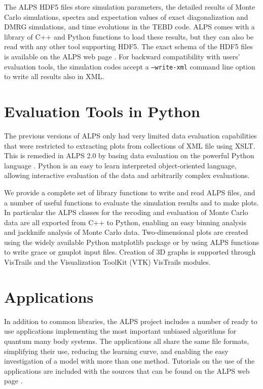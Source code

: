 \documentclass[12pt]{iopart}
\begin{document}
The ALPS HDF5 files store simulation parameters, the detailed results of Monte Carlo simulations, spectra and expectation values of exact diagonalization and DMRG simulations, and time evolutions in the TEBD code. ALPS comes with a library of C++ and Python functions to load these results, but they can also be read with any other tool supporting HDF5. The exact schema of the HDF5 files is available on the ALPS web page \cite{alps}. For backward compatibility with users' evaluation tools, the simulation codes accept a {\tt --write-xml} command line option to write all results also in XML. 

\section{Evaluation Tools in Python}

The previous versions of ALPS  only had very limited data evaluation capabilities that were restricted to extracting plots from collections of XML file using XSLT. This is remedied in ALPS 2.0 by basing data evaluation on the powerful Python language \cite{python}. Python is an easy to learn interpreted object-oriented language, allowing interactive evaluation of the data and arbitrarily complex evaluations. 

We provide a complete set of library functions to write and read ALPS files, and a number of useful functions to evaluate the simulation results and to make plots. In particular the ALPS classes for the recoding and evaluation of Monte Carlo data are all exported from C++ to Python, enabling an easy binning analysis \cite{Ambegaokar2010} and jackknife analysis of Monte Carlo data.
Two-dimensional plots are created using the widely available Python matplotlib package \cite{matplotlib} or by using ALPS functions to write grace \cite{grace} or gnuplot \cite{gnuplot} input files. Creation of 3D graphs is supported through VisTrails and the Visualization ToolKit (VTK) \cite{vtk} VisTrails modules.



\section{Applications}
\label{sec:applications}
In addition to common libraries, the ALPS project includes a number of ready to use applications implementing the most important unbiased
algorithms for quantum many body systems. The applications all
share the same file formats, simplifying their use, reducing the
learning curve, and enabling the easy investigation of a model with
more than one method. Tutorials on the use of the applications are
included with the sources that can be found on the ALPS web
page \cite{alps}.
\end{document}

